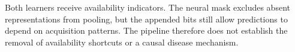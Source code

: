 Both learners receive availability indicators. The neural mask excludes absent representations from pooling, but the appended bits still allow predictions to depend on acquisition patterns. The pipeline therefore does not establish the removal of availability shortcuts or a causal disease mechanism.
